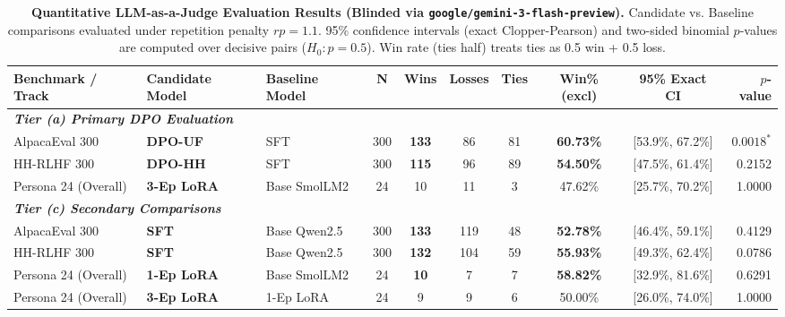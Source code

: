 \begin{table}[t]
\centering
\small
\caption{\textbf{Quantitative LLM-as-a-Judge Evaluation Results (Blinded via \texttt{google/gemini-3-flash-preview}).} Candidate vs. Baseline comparisons evaluated under repetition penalty $rp=1.1$. 95\% confidence intervals (exact Clopper-Pearson) and two-sided binomial $p$-values are computed over decisive pairs ($H_0: p = 0.5$). Win rate (ties half) treats ties as 0.5 win + 0.5 loss.}
\label{tab:quantitative}
\begin{tabularx}{\textwidth}{lXXccccccr}
\toprule
\textbf{Benchmark / Track} & \textbf{Candidate Model} & \textbf{Baseline Model} & \textbf{N} & \textbf{Wins} & \textbf{Losses} & \textbf{Ties} & \textbf{Win\% (excl)} & \textbf{95\% Exact CI} & \textbf{$p$-value} \\
\midrule
\multicolumn{10}{l}{\textit{\textbf{Tier (a) Primary DPO Evaluation}}} \\
AlpacaEval 300 & \textbf{DPO-UF} & SFT & 300 & \textbf{133} & 86 & 81 & \textbf{60.73\%} & [53.9\%, 67.2\%] & $\mathbf{0.0018}^*$ \\
HH-RLHF 300 & \textbf{DPO-HH} & SFT & 300 & \textbf{115} & 96 & 89 & \textbf{54.50\%} & [47.5\%, 61.4\%] & 0.2152 \\
Persona 24 (Overall) & \textbf{3-Ep LoRA} & Base SmolLM2 & 24 & 10 & 11 & 3 & 47.62\% & [25.7\%, 70.2\%] & 1.0000 \\
\midrule
\multicolumn{10}{l}{\textit{\textbf{Tier (c) Secondary Comparisons}}} \\
AlpacaEval 300 & \textbf{SFT} & Base Qwen2.5 & 300 & \textbf{133} & 119 & 48 & \textbf{52.78\%} & [46.4\%, 59.1\%] & 0.4129 \\
HH-RLHF 300 & \textbf{SFT} & Base Qwen2.5 & 300 & \textbf{132} & 104 & 59 & \textbf{55.93\%} & [49.3\%, 62.4\%] & 0.0786 \\
Persona 24 (Overall) & \textbf{1-Ep LoRA} & Base SmolLM2 & 24 & \textbf{10} & 7 & 7 & \textbf{58.82\%} & [32.9\%, 81.6\%] & 0.6291 \\
Persona 24 (Overall) & \textbf{3-Ep LoRA} & 1-Ep LoRA & 24 & 9 & 9 & 6 & 50.00\% & [26.0\%, 74.0\%] & 1.0000 \\
\bottomrule
\end{tabularx}
\end{table}